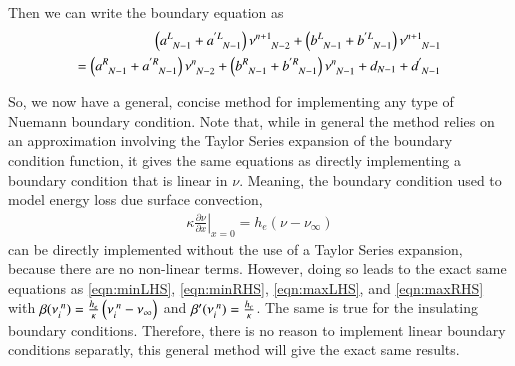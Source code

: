 \documentclass[letterpaper,12pt]{article}
\begin{document}
Then we can write the boundary equation as
\begin{align}
  \left( a\indices{^L_{N-1}} + a\indices{^{'L}_{N-1}} \right) \nu\indices{^{n+1}_{N-2}}
+ \left( b\indices{^L_{N-1}} + b\indices{^{'L}_{N-1}} \right) \nu\indices{^{n+1}_{N-1}} \nonumber \\
=
  \left( a\indices{^R_{N-1}} + a\indices{^{'R}_{N-1}} \right) \nu\indices{^{n  }_{N-2}}
+ \left( b\indices{^R_{N-1}} + b\indices{^{'R}_{N-1}} \right) \nu\indices{^{n  }_{N-1}}
+ d_{N-1} + d\indices{^'_{N-1}}
\end{align}

So, we now have a general, concise method for implementing any type of Nuemann boundary condition. Note that, while in general the
method relies on an approximation involving the Taylor Series expansion of the boundary condition function, it gives the same
equations as directly implementing a boundary condition that is linear in $\nu$. Meaning, the boundary condition used to model energy loss
due surface convection,
\begin{align}
  \kappa \left.\frac{\partial \nu}{\partial x}\right|_{x=0} = h_e \left(\nu - \nu_{\infty}\right)
\end{align}
can be directly implemented without the use of a Taylor Series expansion, because there are no non-linear terms. However, doing
so leads to the exact same equations as \ref{eqn:minLHS}, \ref{eqn:minRHS}, \ref{eqn:maxLHS}, and \ref{eqn:maxRHS} with
$\beta(\nu\indices{_{i}^n}) = \frac{h_e}{\kappa} \left(\nu\indices{_i^n} - \nu_{\infty}\right)$ and 
$\beta'(\nu\indices{_{i}^n}) = \frac{h_e}{\kappa}$. The same is true for the insulating boundary conditions.
Therefore, there is no reason to implement linear boundary conditions separatly, this general method will give the exact same
results.
\end{document}
